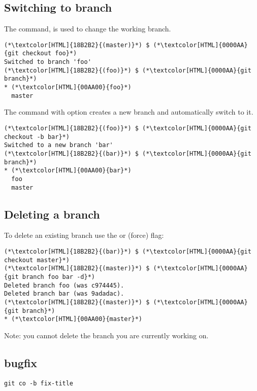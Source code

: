 \subsection{Switching to branch}
\begin{frame}[fragile]
    \subslidetitle
The  command, is used to change the working branch.
\begin{lstlisting}
(*\textcolor[HTML]{18B2B2}{(master)}*) $ (*\textcolor[HTML]{0000AA}{git checkout foo}*)
Switched to branch 'foo'
(*\textcolor[HTML]{18B2B2}{(foo)}*) $ (*\textcolor[HTML]{0000AA}{git branch}*)
* (*\textcolor[HTML]{00AA00}{foo}*)
  master
\end{lstlisting}

The  command with  option creates a new branch and automatically switch to it.
\begin{lstlisting}
(*\textcolor[HTML]{18B2B2}{(foo)}*) $ (*\textcolor[HTML]{0000AA}{git checkout -b bar}*)
Switched to a new branch 'bar'
(*\textcolor[HTML]{18B2B2}{(bar)}*) $ (*\textcolor[HTML]{0000AA}{git branch}*)
* (*\textcolor[HTML]{00AA00}{bar}*)
  foo
  master
\end{lstlisting}
\end{frame}

\subsection{Deleting a branch}
\begin{frame}[fragile]
    \subslidetitle
To delete an existing branch use the  or  (force) flag:
\begin{lstlisting}
(*\textcolor[HTML]{18B2B2}{(bar)}*) $ (*\textcolor[HTML]{0000AA}{git checkout master}*)
(*\textcolor[HTML]{18B2B2}{(master)}*) $ (*\textcolor[HTML]{0000AA}{git branch foo bar -d}*)
Deleted branch foo (was c974445).
Deleted branch bar (was 9adadac).
(*\textcolor[HTML]{18B2B2}{(master)}*) $ (*\textcolor[HTML]{0000AA}{git branch}*)
* (*\textcolor[HTML]{00AA00}{master}*)
\end{lstlisting}

Note: you cannot delete the branch you are currently working on.

\end{frame}



\subsection{bugfix}
\begin{frame}[fragile]
    \subslidetitle
\begin{lstlisting}
git co -b fix-title

\end{lstlisting}
\end{frame}


